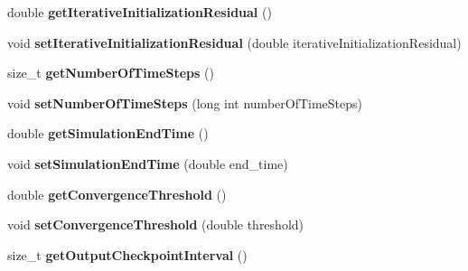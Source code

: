 \begin{DoxyCompactItemize}
\item 
\hypertarget{classnatrium_1_1SolverConfiguration_a966eee9da52af6fbd1f8d5fad2b8427a}{
double {\bfseries getIterativeInitializationResidual} ()}
\label{classnatrium_1_1SolverConfiguration_a966eee9da52af6fbd1f8d5fad2b8427a}

\item 
\hypertarget{classnatrium_1_1SolverConfiguration_ad9551932a38bda46c8ca2ef88a73e754}{
void {\bfseries setIterativeInitializationResidual} (double iterativeInitializationResidual)}
\label{classnatrium_1_1SolverConfiguration_ad9551932a38bda46c8ca2ef88a73e754}

\item 
\hypertarget{classnatrium_1_1SolverConfiguration_a13121a202636553339d5b1f83d196fd7}{
size\_\-t {\bfseries getNumberOfTimeSteps} ()}
\label{classnatrium_1_1SolverConfiguration_a13121a202636553339d5b1f83d196fd7}

\item 
\hypertarget{classnatrium_1_1SolverConfiguration_a50c43893f5c6ed0d73fcccd64f523053}{
void {\bfseries setNumberOfTimeSteps} (long int numberOfTimeSteps)}
\label{classnatrium_1_1SolverConfiguration_a50c43893f5c6ed0d73fcccd64f523053}

\item 
\hypertarget{classnatrium_1_1SolverConfiguration_aa0d9cd3a8d2e6e04fc33e3b4fb8785d9}{
double {\bfseries getSimulationEndTime} ()}
\label{classnatrium_1_1SolverConfiguration_aa0d9cd3a8d2e6e04fc33e3b4fb8785d9}

\item 
\hypertarget{classnatrium_1_1SolverConfiguration_a0d64bd79313ae1aa022d9a2c0e6bc3fd}{
void {\bfseries setSimulationEndTime} (double end\_\-time)}
\label{classnatrium_1_1SolverConfiguration_a0d64bd79313ae1aa022d9a2c0e6bc3fd}

\item 
\hypertarget{classnatrium_1_1SolverConfiguration_a221b5a32cb4cc871536f68a26e14b3c8}{
double {\bfseries getConvergenceThreshold} ()}
\label{classnatrium_1_1SolverConfiguration_a221b5a32cb4cc871536f68a26e14b3c8}

\item 
\hypertarget{classnatrium_1_1SolverConfiguration_a8e7af89ae281933e0f70771ef09147b0}{
void {\bfseries setConvergenceThreshold} (double threshold)}
\label{classnatrium_1_1SolverConfiguration_a8e7af89ae281933e0f70771ef09147b0}

\item 
\hypertarget{classnatrium_1_1SolverConfiguration_a7b7ffc9156ba827ab74ff6f1d7bd9151}{
size\_\-t {\bfseries getOutputCheckpointInterval} ()}
\label{classnatrium_1_1SolverConfiguration_a7b7ffc9156ba827ab74ff6f1d7bd9151}


\end{DoxyCompactItemize}
